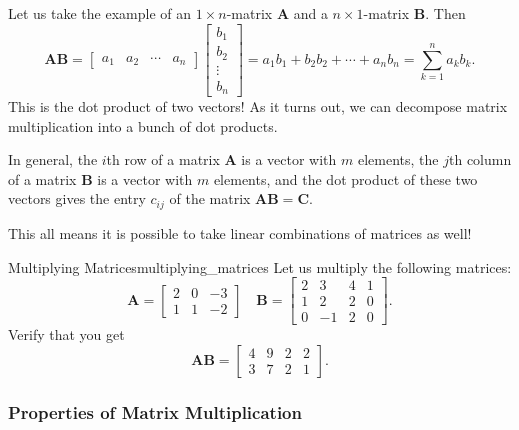 \begin{enumerate}[(i)]
            Let us take the example of an $1\times n$-matrix $\mathbf{A}$ and a $n\times 1$-matrix $\mathbf{B}$. Then
            \[
            \mathbf{AB}=
            \begin{bmatrix} a_1 & a_2 & \cdots & a_n\end{bmatrix}
            \begin{bmatrix} b_1\\ b_2 \\ \vdots \\ b_n\end{bmatrix}=a_1b_1+b_2b_2+\cdots+a_nb_n=\sum_{k=1}^n a_kb_k.
            \]
            This is the dot product of two vectors!  As it turns out, we can decompose matrix multiplication into a bunch of dot products. 
            
            In general, the $i$th row of a matrix $\mathbf{A}$ is a vector with $m$ elements, the $j$th column of a matrix $\mathbf{B}$ is a vector with $m$ elements, and the dot product of these two vectors gives the entry $c_{ij}$ of the matrix $\mathbf{AB}=\mathbf{C}$.
            
            \begin{remark}
            This all means it is possible to take linear combinations of matrices as well!
            \end{remark}
            
            \begin{ex}{Multiplying Matrices}{multiplying_matrices}
            Let us multiply the following matrices:
            \[
            \mathbf{A}=\begin{bmatrix} 2 & 0 & -3\\ 1&1&-2\end{bmatrix} \quad \mathbf{B}=\begin{bmatrix} 2&3&4&1\\1&2&2&0\\0&-1&2&0\end{bmatrix}.
            \]
            Verify that you get
            \[
            \mathbf{AB}=\begin{bmatrix} 4&9&2&2\\3&7&2&1\end{bmatrix}.
            \]
            \end{ex}
            
            
            \subsubsection{Properties of Matrix Multiplication}
            

\end{enumerate}
